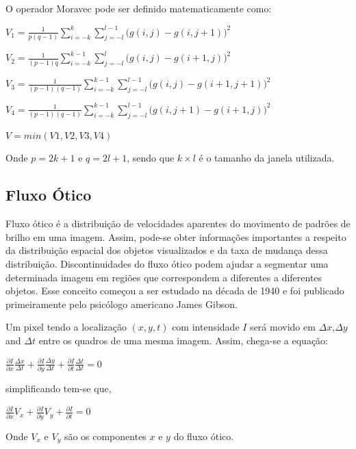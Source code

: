 \documentclass[9pt, a4paper, nofonttune, journal]{IEEEtran}
\begin{document}
O operador Moravec pode ser definido matematicamente como:
    \begin{center}$V_{1}=\frac{1}{p(q-1)}\sum_{i=-k}^k\sum_{j=-l}^{l-1}\bigl(g(i,j)-g(i,j+1)\bigr)^2$    \end{center}
    \begin{center}$V_{2}=\frac{1}{(p-1)q}\sum_{i=-k}^{k-1}\sum_{j=-l}^l\bigl(g(i,j)-g(i+1,j)\bigr)^2$    \end{center}
    \begin{center}$V_{3}=\frac{1}{(p-1)(q-1)}\sum_{i=-k}^{k-1}\sum_{j=-l}^{l-1}\bigl(g(i,j)-g(i+1,j+1)\bigr)^2$\end{center}
    \begin{center}$V_{4}=\frac{1}{(p-1)(q-1)}\sum_{i=-k}^{k-1}\sum_{j=-l}^{l-1}\bigl(g(i,j+1)-g(i+1,j)\bigr)^2$\end{center}
    \begin{center}$V = min(V1,V2,V3,V4)$\end{center}

    Onde $p = 2k + 1$ e $q = 2l + 1$, sendo que $k\times l$ é o tamanho da janela utilizada. 


\subsection{Fluxo Ótico}
Fluxo ótico é a distribuição de velocidades aparentes do movimento de padrões de brilho em uma imagem.\cite{GibsonBook1}
Assim, pode-se obter informações importantes a respeito da distribuição espacial dos objetos visualizados 
e da taxa de mudança dessa distribuição. Discontinuidades do fluxo ótico podem ajudar a segmentar uma determinada imagem 
em regiões que correspondem a diferentes a diferentes objetos.
Esse conceito começou a ser estudado na década de 1940 e foi publicado primeiramente pelo psicólogo americano James Gibson.\cite{Gibson1} \cite{OF1}

Um pixel tendo a localização $(x,y,t)$ com intensidade $I$ será movido em $\Delta x$,$\Delta y$ and $\Delta t$ entre os quadros de uma mesma imagem.
Assim, chega-se a equação:

\begin{center}
$\frac{\partial I}{\partial x}\frac{\Delta x}{\Delta t}+\frac{\partial I}{\partial y}\frac{\Delta y}{\Delta t}+\frac{\partial I}{\partial t}\frac{\Delta t}{\Delta t} = 0 $\end{center}
simplificando tem-se que,
\begin{center}
$\frac{\partial I}{\partial x}V_x+\frac{\partial I}{\partial y}V_y+\frac{\partial I}{\partial t} = 0$\end{center}
Onde $V_x$ e $V_y$ são os componentes $x$ e $y$ do fluxo ótico.
\end{document}
